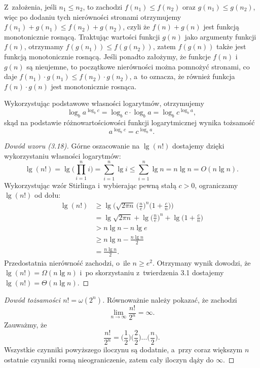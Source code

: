 
\exercise %
Z~założenia, jeśli $n_1\le n_2$, to zachodzi $f(n_1)\le f(n_2)$ oraz $g(n_1)\le g(n_2)$, więc po dodaniu tych nierówności stronami otrzymujemy $f(n_1)+g(n_1)\le f(n_2)+g(n_2)$, czyli że $f(n)+g(n)$ jest funkcją monotonicznie rosnącą.
Traktując wartości funkcji $g(n)$ jako argumenty funkcji $f(n)$, otrzymamy $f(g(n_1))\le f(g(n_2))$, zatem $f(g(n))$ także jest funkcją monotonicznie rosnącą.
Jeśli ponadto założymy, że funkcje $f(n)$ i~$g(n)$ są nieujemne, to początkowe nierówności można pomnożyć stronami, co daje $f(n_1)\cdot g(n_1)\le f(n_2)\cdot g(n_2)$, a~to oznacza, że również funkcja $f(n)\cdot g(n)$ jest monotonicznie rosnąca.

\exercise %
Wykorzystując podstawowe własności logarytmów, otrzymujemy
\[
	\log_ba^{\log_bc} = \log_bc\cdot\log_ba = \log_bc^{\log_ba},
\]
skąd na podstawie różnowartościowości funkcji logarytmicznej wynika tożsamość
\[
	a^{\log_bc} = c^{\log_ba}.
\]

\exercise %
\begin{proof}[Dowód wzoru (3.18)]
	Górne oszacowanie na $\lg(n!)$ dostajemy dzięki wykorzystaniu własności logarytmów:
	\[
	    \lg(n!) = \lg\biggl(\prod_{i=1}^ni\biggr) = \sum_{i=1}^n\lg i \le \sum_{i=1}^n\lg n = n\lg n = O(n\lg n).
	\]
	Wykorzystując wzór Stirlinga i~wybierając pewną stałą $c>0$, ograniczamy $\lg(n!)$ od dołu:
	\begin{align*}
		\lg(n!) &\ge \lg\biggl(\!\sqrt{2\pi n}\,\biggl(\frac{n}{e}\biggr)^n\biggl(1+\frac{c}{n}\biggr)\biggr) \\
		&= \lg\sqrt{2\pi n}+\lg\biggl(\frac{n}{e}\biggr)^n+\lg\biggl(1+\frac{c}{n}\biggr) \\
		&> n\lg n-n\lg e \\
		&\ge n\lg n-\frac{n\lg n}{2} \\
		&= \frac{n\lg n}{2}.
	\end{align*}
	Przedostatnia nierówność zachodzi, o~ile $n\ge e^2$.
Otrzymany wynik dowodzi, że $\lg(n!)=\Omega(n\lg n)$ i~po skorzystaniu z~twierdzenia 3.1 dostajemy $\lg(n!)=\Theta(n\lg n)$.
\end{proof}

\begin{proof}[Dowód tożsamości $n!=\omega(2^n)$]
	Równoważnie należy pokazać, że zachodzi
	\[
		\lim_{n\to\infty}\frac{n!}{2^n} = \infty.
	\]
	Zauważmy, że
	\[
	    \frac{n!}{2^n} = \biggl(\frac{1}{2}\biggr)\biggl(\frac{2}{2}\biggr)\dots\biggl(\frac{n}{2}\biggr).
	\]
	Wszystkie czynniki powyższego iloczynu są dodatnie, a~przy coraz większym $n$ ostatnie czynniki rosną nieograniczenie, zatem cały iloczyn dąży do $\infty$.
\end{proof}

